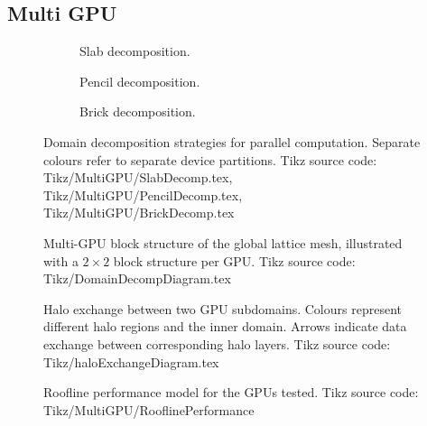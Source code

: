 \clearpage
\subsection{Multi GPU}
%
\begin{figure}[hbt]
    \centering
    \begin{subfigure}{0.32\textwidth}
        \centering
        
        \caption{Slab decomposition.}
    \end{subfigure}
    \hfill
    \begin{subfigure}{0.32\textwidth}
        \centering
        
        \caption{Pencil decomposition.}
    \end{subfigure}
    \hfill
    \begin{subfigure}{0.32\textwidth}
        \centering
        
        \caption{Brick decomposition.}
    \end{subfigure}
    \caption{Domain decomposition strategies for parallel computation. Separate colours refer to separate device partitions. Tikz source code: Tikz/MultiGPU/SlabDecomp.tex, Tikz/MultiGPU/PencilDecomp.tex, Tikz/MultiGPU/BrickDecomp.tex}
    \label{fig:decompositions}
\end{figure}
%
\begin{figure}[hbt]
    \centering
    
    \caption{Multi-GPU block structure of the global lattice mesh, illustrated with a $2 \times 2$ block structure per GPU. Tikz source code: Tikz/DomainDecompDiagram.tex}
    \label{fig:DomainDecompDiagram}
\end{figure}
%
\begin{figure}[hbt!]
    \centering
    
    \caption{Halo exchange between two GPU subdomains. Colours represent different halo regions and the inner domain. Arrows indicate data exchange between corresponding halo layers. Tikz source code: Tikz/haloExchangeDiagram.tex}
    \label{fig:haloExchange}
\end{figure}
%
\begin{figure}[hbt!]
    \centering
    
    \caption{Roofline performance model for the GPUs tested. Tikz source code: Tikz/MultiGPU/RooflinePerformance}
    \label{fig:RooflinePerformance}
\end{figure}
%